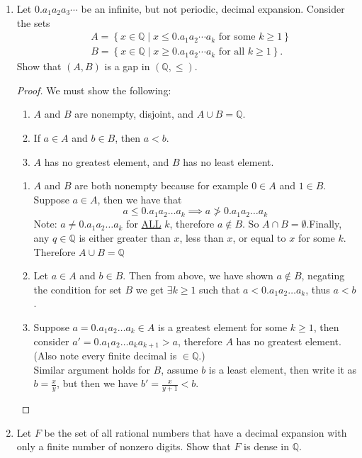 \documentclass[hidelinks,12pt]{article}
\title{\scalebox{2}{Math 524 Homework 1}}
\author{\scalebox{1.5}{Theo Koss}}
\date{Feburary 2024}
\renewcommand{\geq}{\geqslant}
\renewcommand{\leq}{\leqslant}
\newcommand{\Q}{\mathbb{Q}}
\begin{document}
\maketitle
\begin{enumerate}
  \item Let $0 . a_1 a_2 a_3 \cdots$ be an infinite, but not periodic, decimal expansion. Consider the sets
    \[
\begin{aligned}
& A=\left\{x \in \mathbb{Q} \mid x \leq 0 . a_1 a_2 \cdots a_k \text { for some } k \geq 1\right\} \\
& B=\left\{x \in \mathbb{Q} \mid x \geq 0 . a_1 a_2 \cdots a_k \text { for all } k \geq 1\right\} .
\end{aligned}\]
Show that $(A, B)$ is a gap in $(\mathbb{Q}, \leq)$.
\begin{proof}[Proof]
  We must show the following:\begin{enumerate}
    \item $A$ and $B$ are nonempty, disjoint, and $A\cup B=\Q$.
    \item If $a\in A$ and $b\in B$, then $a<b$.
    \item $A$ has no greatest element, and $B$ has no least element.
  \end{enumerate}
  \begin{enumerate}
    \item $A$ and $B$ are both nonempty because for example $0\in A$ and $1\in B$. Suppose $a\in A$, then we have that \[a\leq 0.a_1a_2\dots a_k\implies a\not> 0.a_1a_2\dots a_k\]
      Note: $a\neq 0.a_1a_2\dots a_k$ for \underline{ALL} $k$, therefore $a\notin B$. So $A\cap B=\emptyset$.Finally, any $q\in\Q$ is either greater than $x$, less than $x$, or equal to $x$ for some $k$. Therefore $A\cup B=\Q$ 
    \item Let \(a\in A\) and $b\in B$. Then from above, we have shown $a\notin B$, negating the condition for set $B$ we get $\exists k\geq 1$ such that $a<0.a_1a_2\dots a_k$, thus $a<b$.
    \item Suppose $a=0.a_1a_2\dots a_k\in A$ is a greatest element for some $k\geq1$, then consider $a'=0.a_1a_2\dots a_ka_{k+1}>a$, therefore $A$ has no greatest element. (Also note every finite decimal is $\in\Q$.)\\
      Similar argument holds for $B$, assume $b$ is a least element, then write it as $b=\frac{x}{y}$, but then we have $b'=\frac{x}{y+1}<b$.
  \end{enumerate}
\end{proof}
\item Let $F$ be the set of all rational numbers that have a decimal expansion with only a finite number of nonzero digits. Show that $F$ is dense in $\mathbb{Q}$.

\end{enumerate}
\end{document}
